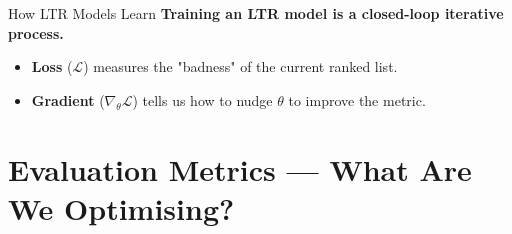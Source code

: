 \documentclass[aspectratio=169]{beamer}
\newif\ifanimated
\newcommand{\cpause}{\ifanimated\pause\fi}
\begin{document}

% 



\begin{frame}{How LTR Models Learn}
\textbf{Training an LTR model is a closed-loop iterative process.}

\vspace{0.8em}
\begin{center}
\resizebox{0.9\textwidth}{!}{

}
\end{center}

\vspace{0.8em}
\begin{itemize}
    \item \textbf{Loss} ($\mathcal{L}$) measures the "badness" of the current ranked list.
    \item \textbf{Gradient} ($\nabla_\theta \mathcal{L}$) tells us how to nudge $\theta$ to improve the metric.
\end{itemize}
\end{frame}

\section{Evaluation Metrics --- What Are We Optimising?}

\begin{frame}[plain]
\sectionpage
\end{frame}
\end{document}
